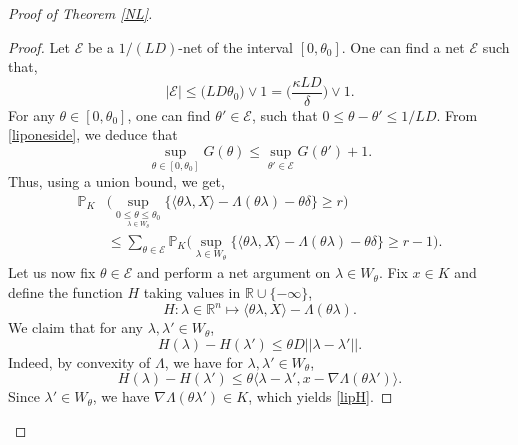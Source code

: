 \documentclass[aop,preprint]{imsart}
\newcommand\RR{\mathbb{R}}
\newcommand\PP{\mathbb{P}}
\numberwithin{equation}{section}
\theoremstyle{definition}
\theoremstyle{plain}
\theoremstyle{remark}
\begin{document}
\begin{proof}[Proof of Theorem \ref{NL}]
\begin{proof}
Let $\mathcal{E}$ be a $1/(LD)$-net of the interval $[0,\theta_0]$.
 One can find a net $\mathcal{E}$ such that,
\begin{equation}\label{carditheta}|\mathcal{E}| \leq  \big(LD \theta_0\big)\vee 1 = \Big( \frac{\kappa LD }{\delta}\Big) \vee 1.\end{equation}
For any $\theta \in [0,\theta_0]$, one can find $\theta' \in \mathcal{E}$, such that $0 \leq \theta-\theta'\leq 1/LD$. From \eqref{liponeside}, we deduce that 
$$ \sup_{\theta \in [0,\theta_0]} G(\theta) \leq \sup_{\theta ' \in \mathcal{E}} G(\theta') + 1.$$
Thus, using a union bound, we get,
\begin{align}
 \PP_K& \big( \sup_{ \underset{\lambda \in  W_{\theta}}{0 \leq \theta \leq \theta_0}} \{ \langle \theta \lambda , X\rangle - \Lambda(\theta\lambda) - \theta \delta\} \geq r\big) \nonumber  \\
&\leq \sum_{\theta \in \mathcal{E}} \PP_K\big( \sup_{ \lambda \in  W_{\theta}}  \{ \langle \theta \lambda , X\rangle - \Lambda(\theta\lambda) - \theta \delta\} \geq r-1\big).\label{unionboundtheta}\end{align}
Let us now fix $\theta  \in \mathcal{E}$ and perform a net argument on $\lambda \in W_\theta$. Fix $x\in K$ and define the function $H$ taking values in $\RR \cup \{-\infty\}$,
$$ H : \lambda \in \RR^n \mapsto \langle \theta \lambda, X\rangle - \Lambda(\theta\lambda).$$
We  claim that for any $\lambda,\lambda'\in W_\theta$,
\begin{equation}\label{lipH} H(\lambda) - H(\lambda')\leq \theta D ||\lambda-\lambda'||.\end{equation}
Indeed, by convexity of $\Lambda$, we have for $\lambda,\lambda'\in W_\theta$,
$$ H(\lambda) - H(\lambda')\leq \theta \langle \lambda-\lambda',x-\nabla \Lambda(\theta \lambda')\rangle.$$
Since $\lambda'\in W_\theta$, we have $\nabla \Lambda(\theta \lambda') \in K$, which yields \eqref{lipH}. 





\end{proof}
\end{proof}
\end{document}
